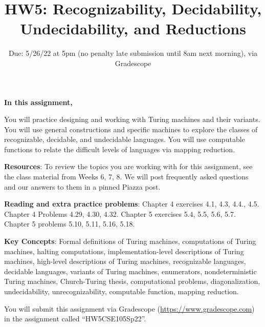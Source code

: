

\title{HW5: Recognizability, Decidability, Undecidability, and Reductions}
\date{Due: 5/26/22 at 5pm (no penalty late submission until 8am next morning), via Gradescope}


\maketitle
\thispagestyle{fancy}

{\bf In this assignment,}

You will practice designing and working with Turing machines and their variants. 
You will use general constructions and specific machines to explore the classes of recognizable, 
decidable, and undecidable languages.
You will use computable functions to relate the difficult levels of languages via mapping reduction.

{\bf Resources}: To review the topics you are working with 
for this assignment, see the class material from Weeks 6, 7, 8.
We will post frequently asked questions and our answers to them in a 
pinned Piazza post.

{\bf Reading and extra practice problems}: Chapter 4 exercises 4.1, 4.3, 4.4., 4.5. 
Chapter 4 Problems 4.29, 4.30, 4.32.  Chapter 5 exercises 5.4, 5.5, 
5.6, 5.7. Chapter 5 problems 5.10, 5.11, 5.16, 5.18.

{\bf Key Concepts}: Formal definitions of Turing machines, computations of Turing machines,
halting computations, implementation-level descriptions of Turing machines, high-level descriptions
of Turing machines, recognizable languages, decidable languages, variants of Turing machines,
enumerators, nondeterministic Turing machines, Church-Turing thesis,
 computational problems, diagonalization, undecidability, unrecognizability, 
computable function, mapping reduction.

\instructions

You will submit this assignment via Gradescope
(\href{https://www.gradescope.com}{https://www.gradescope.com}) 
in the assignment called ``HW5CSE105Sp22''.


